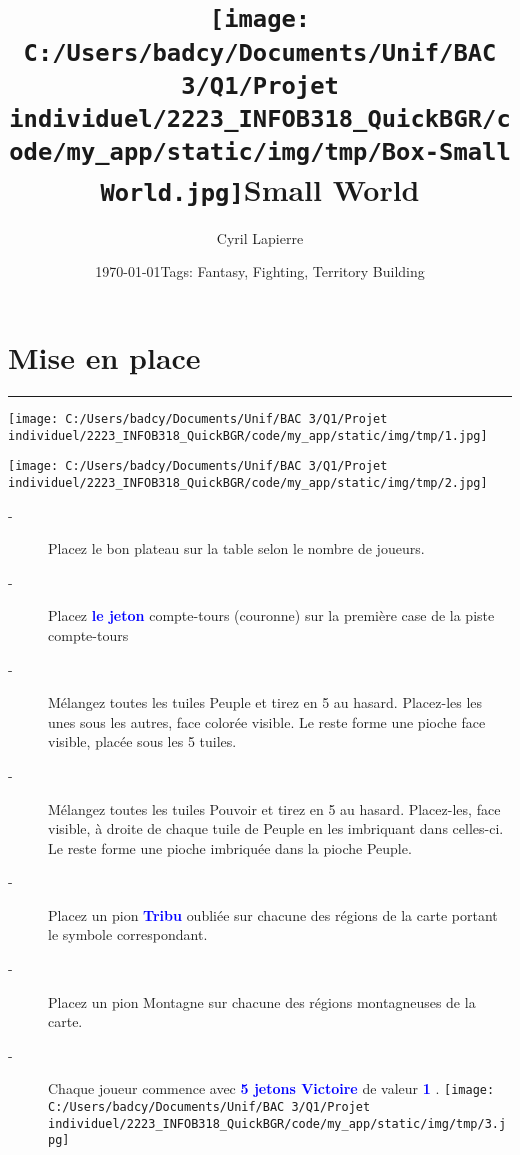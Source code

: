 \documentclass{scrartcl}%
\title{\texttt{[image: C:/Users/badcy/Documents/Unif/BAC 3/Q1/Projet individuel/2223\_INFOB318\_QuickBGR/code/my\_app/static/img/tmp/Box-Small World.jpg]}\break Small World }%
\author{Cyril Lapierre}%
\date{\today \break Tags: Fantasy, Fighting, Territory Building}%
\begin{document}
%
\normalsize%
\maketitle\thispagestyle{header}%
\pagestyle{header}%
\sectionfont{\color{blue}}%
\subsectionfont{\color{blue}}%
\subsubsectionfont{\color{blue}}%
\section{ Mise en place
}%
\label{sec:Miseenplace}%
\textcolor{blue}{\rule{18cm}{0.07cm}}\break%
%
\begin{center}\texttt{[image: C:/Users/badcy/Documents/Unif/BAC 3/Q1/Projet individuel/2223\_INFOB318\_QuickBGR/code/my\_app/static/img/tmp/1.jpg]}\end{center}%
%
\begin{center}\texttt{[image: C:/Users/badcy/Documents/Unif/BAC 3/Q1/Projet individuel/2223\_INFOB318\_QuickBGR/code/my\_app/static/img/tmp/2.jpg]}\end{center}%

%
\begin{description}%
\item[{-} ]%
%
 Placez le bon plateau sur la table selon le nombre de joueurs. 
%
\item[{-} ]%
%
 Placez %
\textcolor{blue}{%
\textbf{le jeton}%
}%
\textit{ }%
 compte{-}tours (couronne) sur la première case de la piste compte{-}tours
%
\item[{-} ]%
%
 Mélangez toutes les tuiles Peuple et tirez en 5 au hasard. Placez{-}les les unes sous les autres, face colorée visible. Le reste forme une pioche face visible, placée sous les 5 tuiles.
%
\item[{-} ]%
%
 Mélangez toutes les tuiles Pouvoir et tirez en 5 au hasard. Placez{-}les, face visible, à droite de chaque tuile de Peuple en les imbriquant dans celles{-}ci. Le reste forme une pioche imbriquée dans la pioche Peuple.
%
\item[{-} ]%
%
 Placez un pion %
\textcolor{blue}{%
\textbf{Tribu}%
}%
\textit{ }%
 oubliée sur chacune des régions de la carte portant le symbole correspondant.
%
\item[{-} ]%
%
 Placez un pion Montagne sur chacune des régions montagneuses de la carte.
%
\item[{-} ]%
%
 Chaque joueur commence avec %
\textcolor{blue}{%
\textbf{5 jetons Victoire}%
}%
\textit{ }%
 de valeur %
\textcolor{blue}{%
\textbf{1}%
}%
.%
\texttt{[image: C:/Users/badcy/Documents/Unif/BAC 3/Q1/Projet individuel/2223\_INFOB318\_QuickBGR/code/my\_app/static/img/tmp/3.jpg]}%

%
\end{description}
\end{document}
